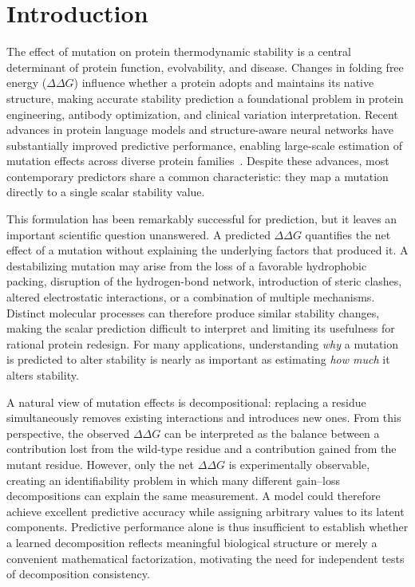 \documentclass[11pt,a4paper]{article}
\theoremstyle{plain}
\theoremstyle{definition}
\begin{document}
\section{Introduction}
The effect of mutation on protein thermodynamic stability is a central determinant of protein function, evolvability, and disease. Changes in folding free energy ($\Delta\Delta G$) influence whether a protein adopts and maintains its native structure, making accurate stability prediction a foundational problem in protein engineering, antibody optimization, and clinical variation interpretation. Recent advances in protein language models and structure-aware neural networks have substantially improved predictive performance, enabling large-scale estimation of mutation effects across diverse protein families~\cite{lin2023evolutionary,dauparas2022robust,rives2021biological}. Despite these advances, most contemporary predictors share a common characteristic: they map a mutation directly to a single scalar stability value.

This formulation has been remarkably successful for prediction, but it leaves an important scientific question unanswered. A predicted $\Delta\Delta G$ quantifies the net effect of a mutation without explaining the underlying factors that produced it. A destabilizing mutation may arise from the loss of a favorable hydrophobic packing, disruption of the hydrogen-bond network, introduction of steric clashes, altered electrostatic interactions, or a combination of multiple mechanisms. Distinct molecular processes can therefore produce similar stability changes, making the scalar prediction difficult to interpret and limiting its usefulness for rational protein redesign. For many applications, understanding \emph{why} a mutation is predicted to alter stability is nearly as important as estimating \emph{how much} it alters stability.

A natural view of mutation effects is decompositional: replacing a residue simultaneously removes existing interactions and introduces new ones. From this perspective, the observed $\Delta\Delta G$ can be interpreted as the balance between a contribution lost from the wild-type residue and a contribution gained from the mutant residue. However, only the net $\Delta\Delta G$ is experimentally observable, creating an identifiability problem in which many different gain--loss decompositions can explain the same measurement. A model could therefore achieve excellent predictive accuracy while assigning arbitrary values to its latent components. Predictive performance alone is thus insufficient to establish whether a learned decomposition reflects meaningful biological structure or merely a convenient mathematical factorization, motivating the need for independent tests of decomposition consistency.
\end{document}
